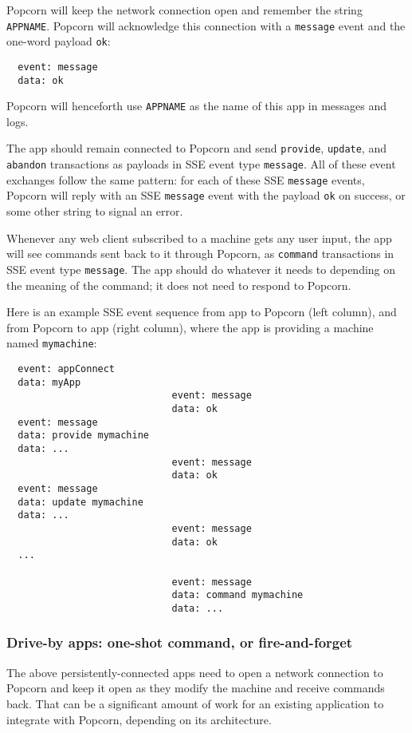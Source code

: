 \documentclass[12pt]{article}
\begin{document}
Popcorn will keep the network connection open and remember the string
\verb`APPNAME`. Popcorn will acknowledge this connection with a \verb`message` event and the one-word payload \verb`ok`:

\begin{verbatim}
  event: message
  data: ok
\end{verbatim}

Popcorn will henceforth use \verb`APPNAME` as the name of this app in
messages and logs.

The app should remain connected to Popcorn and send \verb`provide`,
\verb`update`, and \verb`abandon` transactions as payloads in SSE event type
\verb`message`. All of these event exchanges follow the same pattern: for
each of these SSE \verb`message` events, Popcorn will reply with an SSE
\verb`message` event with the payload \verb`ok` on success, or some other string
to signal an error.

Whenever any web client subscribed to a machine gets any user input,
the app will see commands sent back to it through Popcorn, as
\verb`command` transactions in SSE event type \verb`message`. The app should do
whatever it needs to depending on the meaning of the command; it does
not need to respond to Popcorn.

Here is an example SSE event sequence from app to Popcorn (left
column), and from Popcorn to app (right column), where the app is
providing a machine named \verb`mymachine`:

\begin{verbatim}
  event: appConnect
  data: myApp
                             event: message
                             data: ok
  event: message
  data: provide mymachine
  data: ...
                             event: message
                             data: ok
  event: message
  data: update mymachine
  data: ...
                             event: message
                             data: ok
  ...

                             event: message
                             data: command mymachine
                             data: ...
\end{verbatim}

\subsubsection{Drive-by apps: one-shot command, or fire-and-forget}

The above persistently-connected apps need to open a network
connection to Popcorn and keep it open as they modify the machine and
receive commands back. That can be a significant amount of work for an
existing application to integrate with Popcorn, depending on its
architecture.
\end{document}

